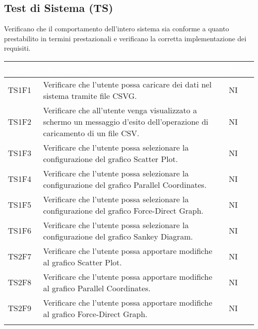     \subsection{Test di Sistema (TS)} Verificano che il comportamento dell'intero sistema sia conforme a quanto prestabilito in termini prestazionali e verificano la corretta implementazione dei requisiti.
    \begin{center}
        \renewcommand\arraystretch{1.5}
        \centering
        \begin{longtable}{|p{1.5cm}|p{11cm}|p{1cm}|}
        \hline
        \rowcolor[HTML]{036400}
        \textcolor{white}{\textbf{Codice}} & \textcolor{white}{\textbf{Descrizione}} & \textcolor{white}{\textbf{Stato}} \\ \hline
            \rowcolor[HTML]{EFEFEF}
            TS1F1 & Verificare che l’utente possa caricare dei dati nel sistema tramite file CSVG. & NI\\ \hline
            \rowcolor[HTML]{C0C0C0}
            TS1F2 & Verificare che all’utente venga visualizzato a schermo un messaggio d’esito dell’operazione di caricamento di un file CSV.& NI\\ \hline
            \rowcolor[HTML]{EFEFEF}
            TS1F3 & Verificare che l’utente possa selezionare la configurazione del grafico Scatter Plot. & NI\\ \hline
            \rowcolor[HTML]{C0C0C0}
            TS1F4 & Verificare che l’utente possa selezionare la configurazione del grafico Parallel Coordinates. & NI\\ \hline
            \rowcolor[HTML]{EFEFEF}
            TS1F5 & Verificare che l’utente possa selezionare la configurazione del grafico Force-Direct Graph. & NI\\ \hline
            \rowcolor[HTML]{C0C0C0}
            TS1F6 & Verificare che l’utente possa selezionare la configurazione del grafico Sankey Diagram. & NI\\ \hline
            \rowcolor[HTML]{C0C0C0}
            TS2F7 & Verificare che l’utente possa apportare modifiche al grafico Scatter Plot. & NI\\ \hline
            \rowcolor[HTML]{EFEFEF}
            TS2F8 & Verificare che l’utente possa apportare modifiche al grafico Parallel Coordinates. & NI\\ \hline
            \rowcolor[HTML]{C0C0C0}
            TS2F9 & Verificare che l’utente possa apportare modifiche al grafico Force-Direct Graph. & NI\\ \hline
            \rowcolor[HTML]{EFEFEF}

\end{longtable}
\end{center}

